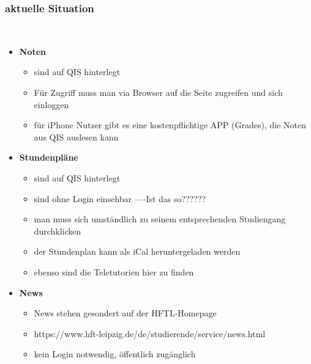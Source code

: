 \subsubsection{\textbf{aktuelle Situation}}\

   \begin{itemize}
      \item \textbf{Noten}
      \begin{itemize}
         \item sind auf QIS hinterlegt
         \item Für Zugriff muss man via Browser auf die Seite zugreifen und sich einloggen
         \item für iPhone Nutzer gibt es eine kostenpflichtige APP (Grades), die Noten aus QIS auslesen kann
      \end{itemize}
      \item \textbf{Stundenpläne}
      \begin{itemize}
      	\item sind auf QIS hinterlegt
      	\item sind ohne Login einsehbar ----Ist das so??????
      	\item man muss sich umständlich zu seinem entsprechenden Studiengang durchklicken
      	\item der Stundenplan kann als iCal heruntergeladen werden
      	\item ebenso sind die Teletutorien hier zu finden
      \end{itemize}
      \item \textbf{News}
      \begin{itemize}
      	\item News stehen gesondert auf der HFTL-Homepage
      	\item https://www.hft-leipzig.de/de/studierende/service/news.html
      	\item kein Login notwendig, öffentlich zugänglich
      \end{itemize}
   \end{itemize}\
\\

